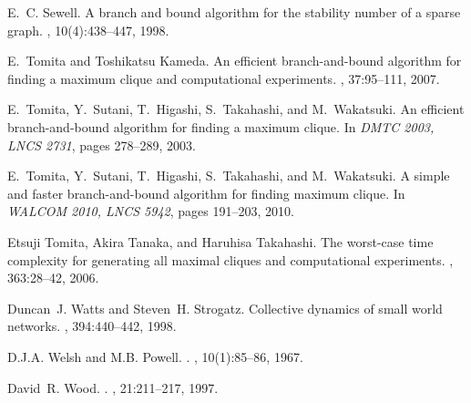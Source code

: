 \documentclass{l4proj}
\begin{document}
\begin{thebibliography}{10}
E.~C. Sewell.
\newblock A branch and bound algorithm for the stability number of a sparse
  graph.
, 10(4):438--447, 1998.

E.~Tomita and Toshikatsu Kameda.
\newblock An efficient branch-and-bound algorithm for finding a maximum clique
  and computational experiments.
, 37:95--111, 2007.

E.~Tomita, Y.~Sutani, T.~Higashi, S.~Takahashi, and M.~Wakatsuki.
\newblock An efficient branch-and-bound algorithm for finding a maximum clique.
\newblock In {\em DMTC 2003, LNCS 2731}, pages 278--289, 2003.

E.~Tomita, Y.~Sutani, T.~Higashi, S.~Takahashi, and M.~Wakatsuki.
\newblock A simple and faster branch-and-bound algorithm for finding maximum
  clique.
\newblock In {\em WALCOM 2010, LNCS 5942}, pages 191--203, 2010.

Etsuji Tomita, Akira Tanaka, and Haruhisa Takahashi.
\newblock The worst-case time complexity for generating all maximal cliques and
  computational experiments.
, 363:28--42, 2006.

Duncan~J. Watts and Steven~H. Strogatz.
\newblock Collective dynamics of small world networks.
, 394:440--442, 1998.

D.J.A. Welsh and M.B. Powell.
.
, 10(1):85--86, 1967.

David~R. Wood.
.
, 21:211--217, 1997.

\end{thebibliography}
\end{document}
